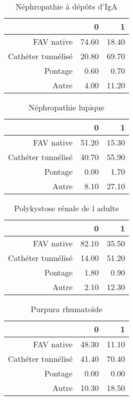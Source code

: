 \documentclass[11pt,a4paper]{article}\usepackage[]{graphicx}\usepackage[]{color}
\begin{document}
\begin{multicols}{2}
\begin{table}[H]
\centering
\begin{tabular}{rrr}
  \hline
 & 0 & 1 \\ 
  \hline
FAV native & 74.60 & 18.40 \\ 
  Cathéter tunnélisé & 20.80 & 69.70 \\ 
  Pontage & 0.60 & 0.70 \\ 
  Autre & 4.00 & 11.20 \\ 
   \hline
\end{tabular}
\caption{Néphropathie à dépôts d'IgA} 
\end{table}
\begin{table}[H]
\centering
\begin{tabular}{rrr}
  \hline
 & 0 & 1 \\ 
  \hline
FAV native & 51.20 & 15.30 \\ 
  Cathéter tunnélisé & 40.70 & 55.90 \\ 
  Pontage & 0.00 & 1.70 \\ 
  Autre & 8.10 & 27.10 \\ 
   \hline
\end{tabular}
\caption{Néphropathie lupique} 
\end{table}
\begin{table}[H]
\centering
\begin{tabular}{rrr}
  \hline
 & 0 & 1 \\ 
  \hline
FAV native & 82.10 & 35.50 \\ 
  Cathéter tunnélisé & 14.00 & 51.20 \\ 
  Pontage & 1.80 & 0.90 \\ 
  Autre & 2.10 & 12.30 \\ 
   \hline
\end{tabular}
\caption{Polykystose rénale de l adulte} 
\end{table}
\begin{table}[H]
\centering
\begin{tabular}{rrr}
  \hline
 & 0 & 1 \\ 
  \hline
FAV native & 48.30 & 11.10 \\ 
  Cathéter tunnélisé & 41.40 & 70.40 \\ 
  Pontage & 0.00 & 0.00 \\ 
  Autre & 10.30 & 18.50 \\ 
   \hline
\end{tabular}
\caption{Purpura rhumatoïde} 
\end{table}

\end{multicols}
\end{document}
